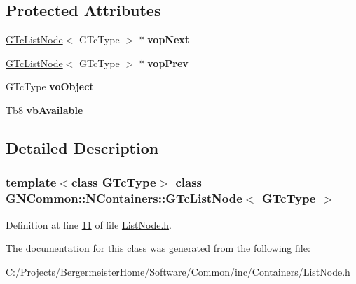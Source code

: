 \subsection*{Protected Attributes}
\begin{DoxyCompactItemize}
\item 
\mbox{\label{class_g_n_common_1_1_n_containers_1_1_g_tc_list_node_af93509661668861bd31387c744451143}} 
\mbox{\hyperlink{class_g_n_common_1_1_n_containers_1_1_g_tc_list_node}{G\+Tc\+List\+Node}}$<$ G\+Tc\+Type $>$ $\ast$ {\bfseries vop\+Next}
\item 
\mbox{\label{class_g_n_common_1_1_n_containers_1_1_g_tc_list_node_aa5249ecdfe6ec1b7f0bd40df99fa071d}} 
\mbox{\hyperlink{class_g_n_common_1_1_n_containers_1_1_g_tc_list_node}{G\+Tc\+List\+Node}}$<$ G\+Tc\+Type $>$ $\ast$ {\bfseries vop\+Prev}
\item 
\mbox{\label{class_g_n_common_1_1_n_containers_1_1_g_tc_list_node_addaf7e3067ae969fde633b63be203bf8}} 
G\+Tc\+Type {\bfseries vo\+Object}
\item 
\mbox{\label{class_g_n_common_1_1_n_containers_1_1_g_tc_list_node_a44a4bdf6606a747e616753e68d211f76}} 
\mbox{\hyperlink{namespace_g_n_common_a8115dc7ed53b6e5b52e6bfde1632ea74}{Tb8}} {\bfseries vb\+Available}
\end{DoxyCompactItemize}


\subsection{Detailed Description}
\subsubsection*{template$<$class G\+Tc\+Type$>$\newline
class G\+N\+Common\+::\+N\+Containers\+::\+G\+Tc\+List\+Node$<$ G\+Tc\+Type $>$}



Definition at line \mbox{\hyperlink{_list_node_8h_source_l00011}{11}} of file \mbox{\hyperlink{_list_node_8h_source}{List\+Node.\+h}}.



The documentation for this class was generated from the following file\+:\begin{DoxyCompactItemize}
\item 
C\+:/\+Projects/\+Bergermeister\+Home/\+Software/\+Common/inc/\+Containers/List\+Node.\+h\end{DoxyCompactItemize}
